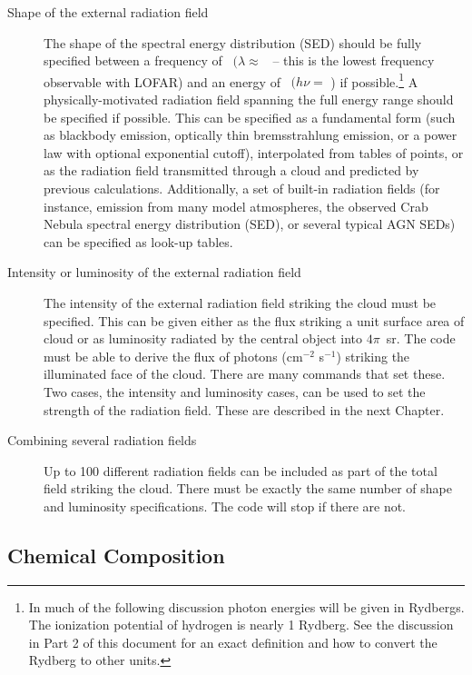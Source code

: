 \begin{description}

\item[Shape of the external radiation field]
The shape of the spectral energy distribution (SED)
should be fully specified between a frequency
of \emmmhz\ $(\lambda \approx$ \emmcm\ -- this is the lowest
frequency observable with LOFAR) and an energy
of \egamry\ $(h\nu =$ \egamrymev)
if possible.\footnote{
In much of the following discussion photon energies will
be given in Rydbergs.  The ionization potential of hydrogen is nearly 1
Rydberg.  See the discussion in Part 2 of this document for an exact
definition and how to convert the Rydberg to other units.}
A physically-motivated radiation field spanning the full energy range
should be specified if possible.
This can be specified as a fundamental
form (such as blackbody emission, optically thin bremsstrahlung emission,
or a power law with optional exponential cutoff), interpolated from tables
of points, or as the radiation field transmitted through a cloud and
predicted by previous calculations.
Additionally, a set of built-in radiation fields
(for instance, emission from many model atmospheres, the observed
Crab Nebula spectral energy distribution (SED), or several typical AGN SEDs) can be specified as look-up tables.

\item[Intensity or luminosity of the external radiation field]
The intensity of the external radiation field striking the
cloud must be specified.
This can be given either as the flux striking a unit surface
area of cloud or as luminosity  radiated by the central object into $4\pi$~sr.
The code must be able to derive the flux of photons (cm$^{-2}$ s$^{-1}$) striking
the illuminated face of the cloud.
There are many commands that set these.
Two cases, the intensity and luminosity cases, can be used to
set the strength of the radiation field.
These are described in the next Chapter.

\item[Combining several radiation fields]
Up to 100 different radiation fields can be included as part of
the total field striking the cloud.
There must be exactly the same number of shape and luminosity
specifications.
The code will stop if there are not.

\end{description}

\subsection{Chemical Composition}

